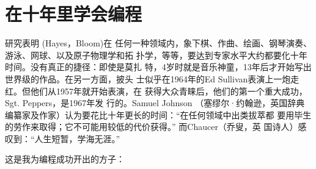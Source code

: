 \section{在十年里学会编程}

研究表明 (Hayes，Bloom)在 任何一种领域内，象下棋、作曲、绘画、钢琴演奏、游泳、网球、以及原子物理学和拓 扑学，等等，要达到专家水平大约都要化十年时间。没有真正的捷径：即使是莫扎 特，4岁时就是音乐神童，13年后才开始写出世界级的作品。在另一方面，披头 士似乎在1964年的Ed Sullivan表演上一炮走红。但他们从1957年就开始表演，在 获得大众青睐后，他们的第一个重大成功，Sgt. Peppers，是1967年发 行的。Samuel Johnson （塞缪尔·约翰逊，英国辞典编纂家及作家）认为要花比十年更长的时间：“在任何领域中出类拔萃都 要用毕生的劳作来取得；它不可能用较低的代价获得。” 而Chaucer（乔叟，英 国诗人）感叹到：“人生短暂，学海无涯。”

这是我为编程成功开出的方子：


